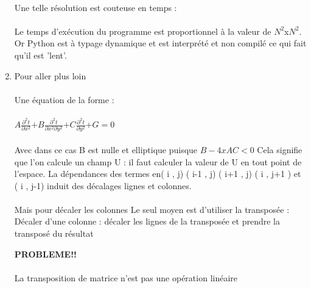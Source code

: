 \documentclass{article}
\begin{document}
\begin{enumerate}
\begin{enumerate}
\begin{itemize}
\end{itemize}
  
   \end{enumerate}
   
   
   
   
   
   \paragraph{}
    Une telle résolution est couteuse en temps : 
    \paragraph{}
   Le temps d'exécution du programme est proportionnel à la valeur de $N^2$x$N^2$. 
   Or Python est à typage dynamique et est interprété et non compilé ce qui fait qu'il est 'lent'. 
   \item{Pour aller plus loin  } 
   \paragraph{}
   Une équation de la forme  : 
   \paragraph{}
   $A $$\frac{\partial^2 t}{\partial x^2}$$ + B	$$\frac{\partial^2 t}{\partial x^2 \partial y^2}$$ + C 	$$\frac{\partial^2 t}{\partial y^2}$$ +G = 0 $ 
  \paragraph{}
   Avec dans ce cas B est nulle et elliptique puisque $ B - 4 xAC < 0 $ 
   Cela signifie que l’on calcule un champ U : il faut calculer la valeur de U en tout
   point de l’espace. 
   La dépendances des termes en( i , j) ( i-1 , j) ( i+1 , j) ( i , j+1 ) et ( i , j-1) 
   induit des décalages lignes et colonnes. 
   \paragraph{}
   Mais pour décaler les colonnes Le seul moyen est d’utiliser la transposée : 
   Décaler d’une colonne : décaler les lignes de la transposée et prendre la
   transposé du résultat
  
   \textbf{PROBLEME!! }
   \paragraph{}  
   La transposition de matrice n’est pas une opération linéaire

\end{enumerate}
\end{document}
